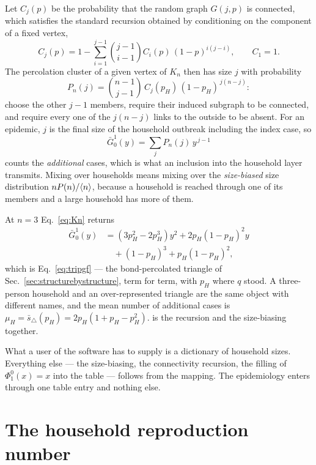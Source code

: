 Let $C_{j}(p)$ be the probability that the random graph $G(j,p)$ is connected,
which satisfies the standard recursion obtained by conditioning on the
component of a fixed vertex,
\[
  C_{j}(p)=1-\sum_{i=1}^{j-1}\binom{j-1}{i-1}C_{i}(p)\,(1-p)^{i(j-i)},
  \qquad C_{1}=1.
\]
The percolation cluster of a given vertex of $K_{n}$ then has size $j$ with
probability
\begin{equation}
  P_{n}(j)=\binom{n-1}{j-1}\,C_{j}(p_{H})\,(1-p_{H})^{\,j(n-j)}:
  \label{eq:Kn}
\end{equation}
choose the other $j-1$ members, require their induced subgraph to be connected,
and require every one of the $j(n-j)$ links to the outside to be absent. For an
epidemic, $j$ is the final size of the household outbreak including the index
case, so
\[
  \bar G^{1}_{0}(y)=\sum_{j}P_{n}(j)\,y^{\,j-1}
\]
counts the \emph{additional} cases, which is what an inclusion into the
household layer transmits. Mixing over households means mixing over the
\emph{size-biased} size distribution $nP(n)/\langle n \rangle$, because a household is
reached through one of its members and a large household has more of them.

At $n=3$ Eq.~\eqref{eq:Kn} returns
\[
  \begin{aligned}
    \bar G^{1}_{0}(y)&=(3p_{H}^{2}-2p_{H}^{3})y^{2}+2p_{H}(1-p_{H})^{2}y\\
    &\quad+(1-p_{H})^{3}+p_{H}(1-p_{H})^{2},
  \end{aligned}
\]
which is Eq.~\eqref{eq:tripgf} --- the bond-percolated triangle of
Sec.~\ref{sec:structurebystructure}, term for term, with $p_{H}$ where $q$
stood. A three-person household and an over-represented triangle are the same
object with different names, and the mean number of additional cases is
$\mu_{H}=\bar s_{\triangle}(p_{H})=2p_{H}(1+p_{H}-p_{H}^{2})$.  is the recursion and the size-biasing together.

What a user of the software has to supply is a dictionary of household sizes.
Everything else --- the size-biasing, the connectivity recursion, the filling of
$\Phi^{0}_{1}(x)=x$ into the table --- follows from the mapping. The
epidemiology enters through one table entry and nothing else.

\section{The household reproduction number}
\label{sec:rstar}

